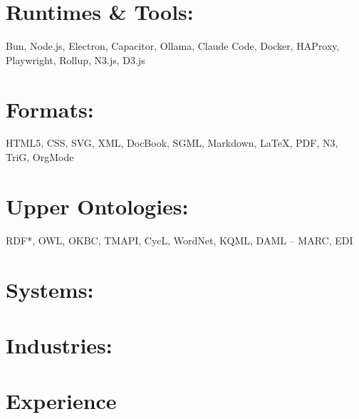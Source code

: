 \documentclass[line,margin,hidelinks]{res}
\begin{document}
\section{Runtimes \& Tools:}
\begin{par}
  Bun, Node.js, Electron, Capacitor, Ollama, Claude Code,
  Docker, HAProxy, Playwright, Rollup, N3.js, D3.js
\end{par}

\section{Formats:}
\begin{par}
  \small{HTML5, CSS, SVG, XML, DocBook, SGML, Markdown, \LaTeX, PDF, N3, TriG, OrgMode}
\end{par}

\section{\footnotesize{Upper Ontologies:}}
\begin{par}
  RDF*, OWL, OKBC, TMAPI, CycL, WordNet, KQML, DAML -- MARC, EDI
\end{par}


% 


\section{Systems:}

\section{Industries:}


\section{Experience}
\end{document}
